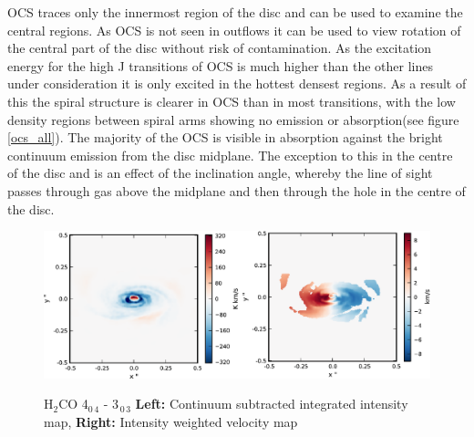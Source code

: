 \documentclass[useAMS,usenatbib]{mn2e}
\begin{document}


OCS traces only the innermost region of the disc and can be used to examine the central regions. As OCS is not seen in outflows it can be used to view rotation of the central part of the disc without risk of contamination. As the excitation energy for the high J transitions of OCS is much higher than the other lines under consideration it is only excited in the hottest densest regions. As a result of this the spiral structure is clearer in OCS than in most transitions, with the low density regions between spiral arms showing no emission or absorption(see figure \ref{ocs_all}). The majority of the OCS is visible in absorption against the bright continuum emission from the disc midplane. The exception to this in the centre of the disc and is an effect of the inclination angle, whereby the line of sight passes through gas above the midplane and then through the hole in the centre of the disc. 

 
%


\begin{figure}
 \includegraphics[width=168mm]{Figures/sim/imageH2CO_4-0-4--3-0-3_30deg_composite_all.eps}
 \label{h2co_all}
 \caption{H$_2$CO 4$_{0\,4}$ - 3$_{\,0\,3}$ {\bf Left:} Continuum subtracted integrated intensity map, {\bf Right:} Intensity weighted velocity map}
\end{figure}
\end{document}

